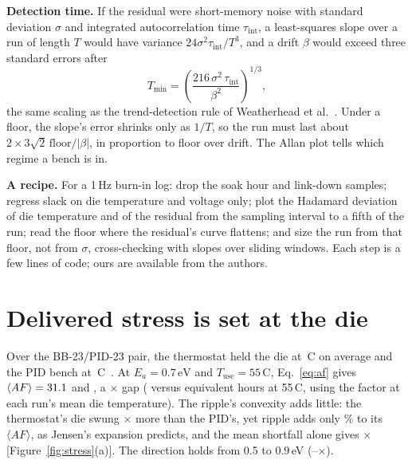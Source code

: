 \documentclass[10pt,twocolumn]{article}
\newcommand{\Tmin}{T_{\min}}
\newcommand{\tint}{\tau_{\mathrm{int}}}
\newcommand{\degC}{\,\textdegree C}
\newcommand{\unit}[1]{\,\mathrm{#1}}
\begin{document}
\textbf{Detection time.} If the residual were short-memory noise with standard deviation $\sigma$ and integrated autocorrelation time $\tint$, a least-squares slope over a run of length $T$ would have variance $24\sigma^2\tint/T^3$, and a drift $\beta$ would exceed three standard errors after
\begin{equation}
\Tmin=\left(\frac{216\,\sigma^2\,\tint}{\beta^2}\right)^{1/3},
\label{eq:tmin}
\end{equation}
the same scaling as the trend-detection rule of Weatherhead et al.~\cite{weatherhead}. Under a floor, the slope's error shrinks only as $1/T$, so the run must last about $2\times3\sqrt2\,\mathrm{floor}/|\beta|$, in proportion to floor over drift. The Allan plot tells which regime a bench is in.

\textbf{A recipe.} For a 1\,Hz burn-in log: drop the soak hour and link-down samples; regress slack on die temperature and voltage only; plot the Hadamard deviation of die temperature and of the residual from the sampling interval to a fifth of the run; read the floor where the residual's curve flattens; and size the run from that floor, not from $\sigma$, cross-checking with slopes over sliding windows. Each step is a few lines of code; ours are available from the authors.

\section{Delivered stress is set at the die}

Over the BB-23/PID-23 pair, the thermostat held the die at \vTBB\degC{} on average and the PID bench at \vTPID\degC~\cite{sbcci26}. At $E_a=0.7\unit{eV}$ and $T_{\mathrm{use}}=55$\degC, Eq.~\eqref{eq:af} gives $\langle AF\rangle=31.1$ and \vAFPID, a \vAFratio$\times$ gap (\vEqhBB{} versus \vEqhPID{} equivalent hours at 55\degC, using the factor at each run's mean die temperature). The ripple's convexity adds little: the thermostat's die swung \vTsdRatio$\times$ more than the PID's, yet ripple adds only \vRippleBB\% to its $\langle AF\rangle$, as Jensen's expansion predicts, and the mean shortfall alone gives \vAFratioMeanOnly$\times$ [Figure~\ref{fig:stress}(a)]. The direction holds from 0.5 to 0.9\,eV (\vAFratioLoOne--\vAFratioHiOne$\times$).
\end{document}
